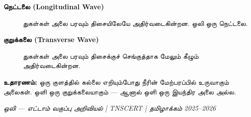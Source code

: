 \documentclass[12pt,a4paper]{tufte-handout}
\begin{document}
\begin{tcolorbox}[conceptbox]
\begin{description}
  \item[\textbf{நெட்டலை (Longitudinal Wave)}] துகள்கள் அலை பரவும் திசையிலேயே
        அதிர்வடைகின்றன. ஒலி ஒரு நெட்டலை.
  \item[\textbf{குறுக்கலை (Transverse Wave)}] துகள்கள் அலை பரவும் திசைக்குச்
        செங்குத்தாக மேலும் கீழும் அதிர்வடைகின்றன.
\end{description}
\textbf{உதாரணம்:} ஒரு குளத்தில் கல்லை எறியும்போது நீரின் மேற்பரப்பில் உருவாகும் அலைகள்.
ஒளி ஒரு குறுக்கலையாகும் --- ஆனால் ஒளி ஒரு இயந்திர அலை அல்ல.
\end{tcolorbox}

\bigskip\bigskip

\begin{center}
\small\textit{ஒலி --- எட்டாம் வகுப்பு அறிவியல் | TNSCERT | தமிழாக்கம் 2025--2026}
\end{center}
\end{document}

